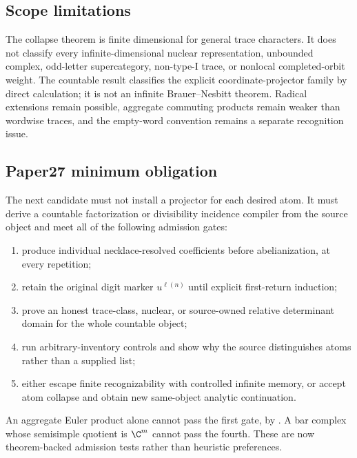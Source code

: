 \subsection{Scope limitations}

The collapse theorem is finite dimensional for general trace characters.  It
does not classify every infinite-dimensional nuclear representation,
unbounded complex, odd-letter supercategory, non-type-I trace, or nonlocal
completed-orbit weight.  The countable result classifies the explicit
coordinate-projector family by direct calculation; it is not an infinite
Brauer--Nesbitt theorem.  Radical extensions remain possible, aggregate
commuting products remain weaker than wordwise traces, and the empty-word
convention remains a separate recognition issue.

\subsection{Paper27 minimum obligation}

The next candidate must not install a projector for each desired atom.  It
must derive a countable factorization or divisibility incidence compiler from
the source object and meet all of the following admission gates:

\begin{enumerate}
 \item produce individual necklace-resolved coefficients before
 abelianization, at every repetition;
 \item retain the original digit marker \(u^{\ell(n)}\) until explicit
 first-return induction;
 \item prove an honest trace-class, nuclear, or source-owned relative
 determinant domain for the whole countable object;
 \item run arbitrary-inventory controls and show why the source distinguishes
 atoms rather than a supplied list;
 \item either escape finite recognizability with controlled infinite memory,
 or accept atom collapse and obtain new same-object analytic continuation.
\end{enumerate}

An aggregate Euler product alone cannot pass the first gate, by
.  A bar complex whose semisimple quotient is
\(\C^m\) cannot pass the fourth.  These are now theorem-backed admission
tests rather than heuristic preferences.
